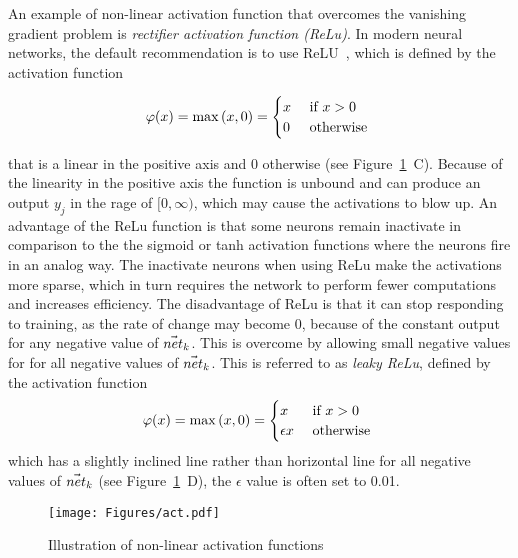 An example of non-linear activation function that overcomes the vanishing gradient problem is \textit{rectifier activation function (ReLu)}. In modern neural networks, the default recommendation is to use ReLU~\cite{JarrettKRL09, NairH10, Heaton18}, which is deﬁned by the activation function 

\begin{equation}
\varphi(x)=\max \left(x, 0\right)= \begin{cases}x &  \text { if } x>0 \\ 0 & \text { otherwise }\end{cases}
\label{eq:relu}
\end{equation}

that is a linear in the positive axis and $0$ otherwise (see Figure~\ref{Fig:act}~C). Because of the linearity in the positive axis the function is unbound and can produce an output $y_j$ in the rage of $[0,\infty)$, which may cause the activations to blow up. An advantage of the ReLu function is that some neurons remain inactivate in comparison to the the sigmoid or tanh activation functions where the neurons fire in an analog way. The inactivate neurons when using ReLu make the activations more sparse, which in turn requires the network to perform fewer computations and increases efficiency. The disadvantage of ReLu is that it can stop responding to training, as the rate of change may become $0$, because of the constant output for any negative value of $\vec{net}_{k}$. This is overcome by allowing small negative values for for all negative values of $\vec{net}_{k}$. This is referred to as \textit{leaky ReLu}, defined by the activation function 
\begin{equation*}
\varphi(x) =\max \left(x, 0\right)= \begin{cases} x & \text { if } x>0 \\ \epsilon x & \text { otherwise }\end{cases}
\end{equation*}
which has a slightly inclined line rather than horizontal line for all negative values of $\vec{net}_{k}$ (see Figure~\ref{Fig:act}~D), the $\epsilon$ value is often set to 0.01.


\begin{figure}[ht!]
	\begin{center}
		\texttt{[image: Figures/act.pdf]}
	\end{center}
	\caption{Illustration of non-linear activation functions}
	\label{Fig:act}
\end{figure} 



